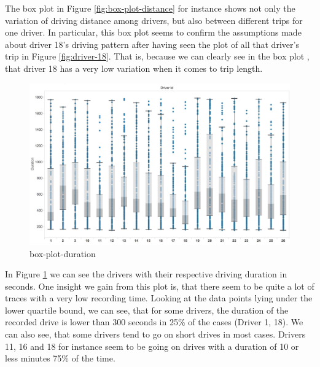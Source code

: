 \documentclass{vldb}
\begin{document}
The box plot in Figure \ref{fig:box-plot-distance} for instance shows not only the variation of driving distance among drivers, but also between different trips for one driver.  In particular, this box plot seems to confirm the assumptions made about driver 18's driving pattern after having seen the plot of all that driver's trip in Figure \ref{fig:driver-18}. That is, because we can clearly see in the box plot , that driver 18 has a very low variation when it comes to trip length. 

\begin{figure}
\centering
\includegraphics[width=\linewidth]{"pics/box-plot-duration"}%
\caption{box-plot-duration}
\label{fig:box-plot-duration}
\end{figure}
In Figure \ref{fig:box-plot-duration} we can see the drivers with their respective driving duration in seconds. One insight we gain from this plot is, that there seem to be quite a lot of traces with a very low recording time. Looking at the data points lying under the lower quartile bound, we can see, that for some drivers, the duration of the recorded drive is lower than 300 seconds in 25\% of the cases (Driver 1, 18). We can also see, that some drivers tend to go on short drives in most cases. Drivers 11, 16 and 18 for instance seem to be going on drives with a duration of 10 or less minutes 75\% of the time.
\end{document}
